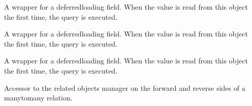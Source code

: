 \documentclass[letterpaper,10pt,french]{sphinxmanual}
\begin{document}
\begin{fulllineitems}
\begin{fulllineitems}
\end{fulllineitems}


\begin{fulllineitems}
\label{\detokenize{main/model:main.models.Etudiant.etablissementPremiere}}
\pysigstartsignatures
{}
\pysigstopsignatures
\sphinxAtStartPar
A wrapper for a deferred\sphinxhyphen{}loading field. When the value is read from this
object the first time, the query is executed.

\end{fulllineitems}


\begin{fulllineitems}
\label{\detokenize{main/model:main.models.Etudiant.etablissementSeconde}}
\pysigstartsignatures
{}
\pysigstopsignatures
\sphinxAtStartPar
A wrapper for a deferred\sphinxhyphen{}loading field. When the value is read from this
object the first time, the query is executed.

\end{fulllineitems}


\begin{fulllineitems}
\label{\detokenize{main/model:main.models.Etudiant.etablissementTerminale}}
\pysigstartsignatures
{}
\pysigstopsignatures
\sphinxAtStartPar
A wrapper for a deferred\sphinxhyphen{}loading field. When the value is read from this
object the first time, the query is executed.

\end{fulllineitems}


\begin{fulllineitems}
\label{\detokenize{main/model:main.models.Etudiant.evaluation_set}}
\pysigstartsignatures
{}
\pysigstopsignatures
\sphinxAtStartPar
Accessor to the related objects manager on the forward and reverse sides of
a many\sphinxhyphen{}to\sphinxhyphen{}many relation.


\end{fulllineitems}
\end{fulllineitems}
\end{document}
